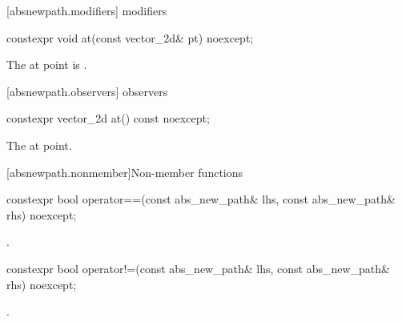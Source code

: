  [absnewpath.modifiers]{ modifiers}%

%
\begin{itemdecl}
constexpr void at(const vector_2d& pt) noexcept;
\end{itemdecl}
\begin{itemdescr}
\pnum
\effects
The at point is .
\end{itemdescr}

 [absnewpath.observers]{ observers}%

%
\begin{itemdecl}
constexpr vector_2d at() const noexcept;
\end{itemdecl}
\begin{itemdescr}
\pnum
\returns
The at point.
\end{itemdescr}

 [absnewpath.nonmember]{Non-member functions}%

%
\begin{itemdecl}
constexpr bool operator==(const abs_new_path& lhs, const abs_new_path& rhs) 
  noexcept;
\end{itemdecl}
\begin{itemdescr}
\pnum
\returns
{}.
\end{itemdescr}

%
\begin{itemdecl}
constexpr bool operator!=(const abs_new_path& lhs, const abs_new_path& rhs) 
  noexcept;
\end{itemdecl}
\begin{itemdescr}
\pnum
\returns
{}.
\end{itemdescr}
